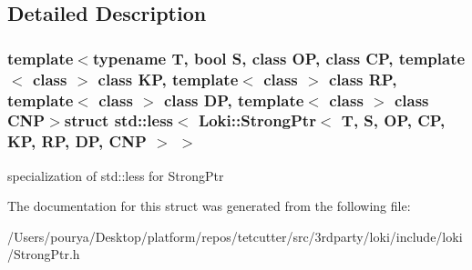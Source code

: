 \subsection{Detailed Description}
\subsubsection*{template$<$typename T, bool S, class O\+P, class C\+P, template$<$ class $>$ class K\+P, template$<$ class $>$ class R\+P, template$<$ class $>$ class D\+P, template$<$ class $>$ class C\+N\+P$>$struct std\+::less$<$ Loki\+::\+Strong\+Ptr$<$ T, S, O\+P, C\+P, K\+P, R\+P, D\+P, C\+N\+P $>$ $>$}

specialization of std\+::less for Strong\+Ptr 

The documentation for this struct was generated from the following file\+:\begin{DoxyCompactItemize}
\item 
/\+Users/pourya/\+Desktop/platform/repos/tetcutter/src/3rdparty/loki/include/loki/Strong\+Ptr.\+h\end{DoxyCompactItemize}
